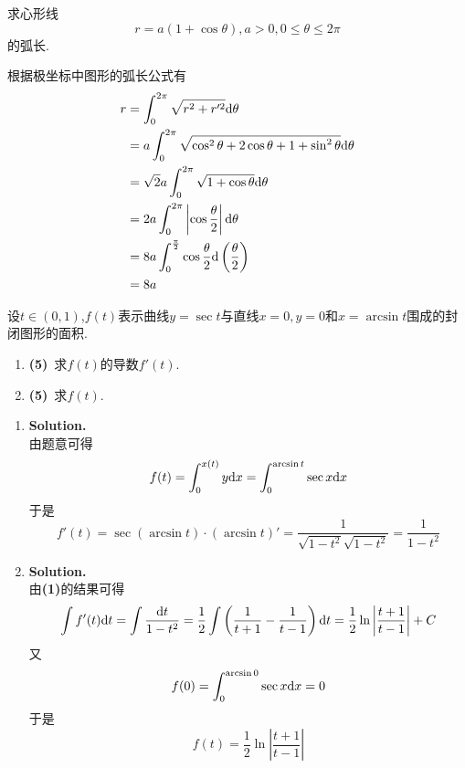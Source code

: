 \documentclass{ctexart}
\begin{document}
\begin{problem}[4.(10\songti 分)]
    求心形线$$r=a(1+\cos\theta),a>0,0\leqslant\theta\leqslant2\pi$$的弧长.
\end{problem}
\begin{solution}[Solution.]
    根据极坐标中图形的弧长公式有
    $$\begin{aligned}
        r
        &= \int_0^{2\pi}\sqrt{r^2+r'^2}\mathrm{d}\theta \\
        &= a\int_0^{2\pi}\sqrt{\cos^2\theta+2\cos\theta+1+\sin^2\theta}\mathrm{d}\theta \\
        &= \sqrt{2}a\int_0^{2\pi}\sqrt{1+\cos\theta}\mathrm{d}\theta \\
        &= 2a\int_0^{2\pi}\left|\cos\dfrac{\theta}{2}\right|\mathrm{d}\theta \\
        &= 8a\int_0^{\frac{\pi}{2}}\cos\dfrac{\theta}{2}\mathrm{d}\left(\dfrac{\theta}{2}\right) \\
        &= 8a
    \end{aligned}$$
\end{solution}
\begin{problem}[5.(10\songti 分)]
    设$t\in(0,1)$,$f(t)$表示曲线$y=\sec t$与直线$x=0,y=0$和$x=\arcsin t$围成的封闭图形的面积.
    \begin{enumerate}[label=\textbf{(\arabic*)}]
        \item \textbf{(5)}\ 求$f(t)$的导数$f'(t)$.
        \item \textbf{(5)}\ 求$f(t)$.
    \end{enumerate}
\end{problem}
\begin{solution}
    \begin{enumerate}[label=\textbf{(\arabic*)}]
        \item \textbf{Solution.}\\
            由题意可得$$f(t)=\int_{0}^{x(t)}y\mathrm{d} x=\int_0^{\arcsin{t}}\sec x\mathrm{d} x$$
            于是$$f'(t)=\sec(\arcsin t)\cdot\left(\arcsin t\right)'=\dfrac{1}{\sqrt{1-t^2}\sqrt{1-t^2}}=\dfrac{1}{1-t^2}$$
        \item \textbf{Solution.}\\
            由\textbf{(1)}的结果可得
            $$\int f'(t)\mathrm{d} t=\int\dfrac{\mathrm{d} t}{1-t^2}=\dfrac{1}{2}\int\left(\dfrac{1}{t+1}-\dfrac{1}{t-1}\right)\mathrm{d} t=\dfrac{1}{2}\ln\left|\dfrac{t+1}{t-1}\right|+C$$
            又$$f(0)=\int_0^{\arcsin0}\sec x\mathrm{d} x=0$$
            于是$$f(t)=\dfrac{1}{2}\ln\left|\dfrac{t+1}{t-1}\right|$$
    \end{enumerate}
\end{solution}
\end{document}
